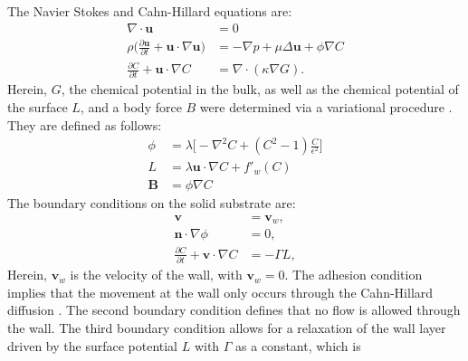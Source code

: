 The Navier Stokes and Cahn-Hillard equations are:
\begin{align}
    \nabla \cdot \textbf{u} &= 0 \\
    \rho\bigg(\frac{\partial\textbf{u}}{\partial t}+\textbf{u}\cdot\nabla\textbf{u}\bigg)&=-\nabla p+\mu\Delta\boldsymbol{u}+\phi\nabla C\\
    \frac{\partial C}{\partial t}+\textbf{u}\cdot\nabla C&=\nabla\cdot(\kappa\nabla G).
\end{align}
Herein, $G$, the chemical potential in the bulk, as well as the chemical potential of the surface $L$, and a body force $B$ were determined via a variational procedure \cite{jacqmin2000ContactlineDynamicsDiffuse}. They are defined as follows:
\begin{align}
    \phi&=\lambda\Bigg[-\nabla^{2}C + (C^2-1)\frac{C}{\epsilon^2}\Bigg]\\
    L&= \lambda \textbf{u}\cdot \nabla C+ f'_w(C)\\
    \boldsymbol{B} &= \phi\nabla C
\end{align}
The boundary conditions on the solid substrate are:
\begin{align}
\textbf{v} &= \textbf{v}_w,\\
\textbf{n}\cdot \nabla \phi &= 0, \\
\frac{\partial C}{\partial t}+\textbf{v}\cdot\nabla C&=-\Gamma L,
\end{align}
Herein, $\boldsymbol{v}_w$ is the velocity of the wall, with $\boldsymbol{v}_w = 0$. The adhesion condition implies that the movement at the wall only occurs through the Cahn-Hillard diffusion \cite{yue2011WallEnergyRelaxation}. The second boundary condition defines that no flow is allowed through the wall. The third boundary condition allows for a relaxation of the wall layer driven by the surface potential $L$ with $\Gamma$ as a constant, which is
